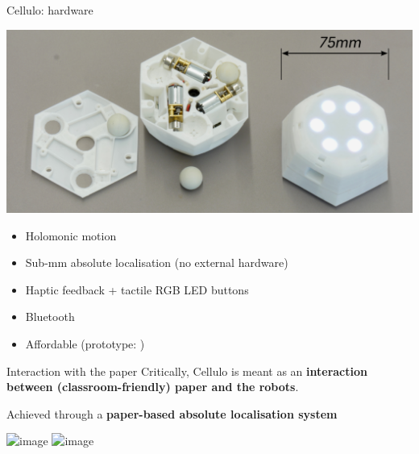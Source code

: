\documentclass[xcolor=table]{beamer}
\begin{document}
 \begin{frame}{Cellulo: hardware}
     \begin{center}
         \includegraphics[width=0.8\linewidth]{cellulo/hardware-design}
     \end{center}
     \begin{itemize}
         \item Holomonic motion
         \item Sub-mm absolute localisation (no external hardware)
         \item Haptic feedback + tactile RGB LED buttons 
         \item Bluetooth
         \item<2> Affordable (prototype: )
     \end{itemize}
 \end{frame}




{
 \begin{frame}{Interaction with the paper}
     Critically, Cellulo is meant as an {\bf interaction between
     (classroom-friendly) paper and the robots}.

     \pause

     Achieved through a {\bf paper-based absolute localisation system}

     \begin{center}
         \includegraphics<3>[width=0.8\linewidth]{cellulo/treasure-game-1}
         \includegraphics<4>[width=\linewidth]{cellulo/treasure-game-2}
     \end{center}


 \end{frame}
}
\end{document}
